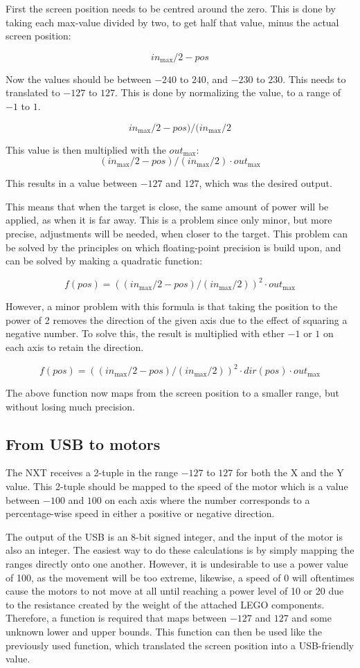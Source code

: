 First the screen position needs to be centred around the zero.
This is done by taking each max-value divided by two, to get half that value, minus the actual screen position:

$$
in_\text{max}/2 - pos
$$

Now the values should be between $-240$ to $240$, and $-230$ to $230$.
This needs to translated to $-127$ to $127$.
This is done by normalizing the value, to a range of $-1$ to $1$.

$$
in_\text{max}/2 - pos)/(in_\text{max}/2
$$


This value is then multiplied with the $out_\text{max}$:
$$
(in_\text{max}/2 - pos)/(in_\text{max}/2) \cdot out_\text{max}
$$

This results in a value between $-127$ and $127$, which was the desired output.


This means that when the target is close, the same amount of power will be applied, as when it is far away.
This is a problem since only minor, but more precise, adjustments will be needed, when closer to the target.
This problem can be solved by the principles on which floating-point precision is build upon, and can be solved by making a quadratic function:

$$
f(pos) = ((in_\text{max}/2 - pos)/(in_\text{max}/2))^2 \cdot out_\text{max}
$$

However, a minor problem with this formula is that taking the position to the power of 2 removes the direction of the given axis due to the effect of squaring a negative number.
To solve this, the result is multiplied with ether $-1$ or $1$ on each axis to retain the direction.

$$
f(pos) = ((in_\text{max}/2 - pos)/(in_\text{max}/2))^2 \cdot dir(pos) \cdot out_\text{max}
$$

The above function now maps from the screen position to a smaller range, but without losing much precision.

\subsection{From USB to motors}
The NXT receives a 2-tuple in the range $-127$ to $127$ for both the X and the Y value.
This 2-tuple should be mapped to the speed of the motor which is a value between $-100$ and $100$ on each axis where the number corresponds to a percentage-wise speed in either a positive or negative direction.

The output of the USB is an 8-bit signed integer, and the input of the motor is also an integer.
The easiest way to do these calculations is by simply mapping the ranges directly onto one another.
However, it is undesirable to use a power value of 100, as the movement will be too extreme, likewise, a speed of 0 will oftentimes cause the motors to not move at all until reaching a power level of 10 or 20 due to the resistance created by the weight of the attached LEGO components.
Therefore, a function is required that maps between $-127$ and $127$ and some unknown lower and upper bounds.
This function can then be used like the previously used function, which translated the screen position into a USB-friendly value.

